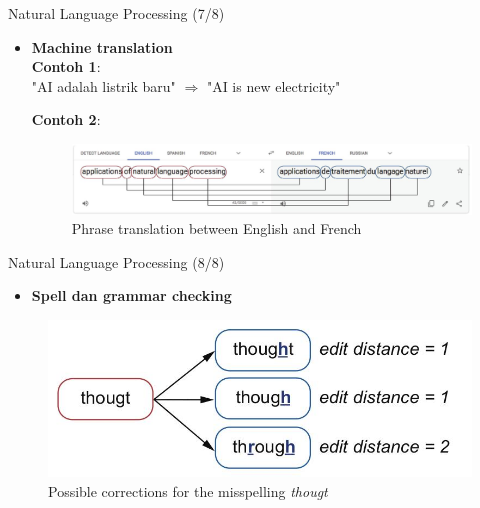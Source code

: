 \documentclass[pdf]{beamer}
\theoremstyle{mystyle}
\begin{document}
\begin{frame}{Natural Language Processing (7/8)}
	\begin{itemize}
		\item \textbf{Machine translation} 	\\
	\textbf{Contoh 1}:\\
"AI adalah listrik baru" $\Longrightarrow$ "AI is new electricity"

\bigskip
\textbf{Contoh 2}:
\begin{figure}[!ht]
	\centering
	\includegraphics[scale=.2]{images/phrase-translation}
	\caption{Phrase translation between English and French}
\end{figure}
	\end{itemize}
\end{frame}

\begin{frame}{Natural Language Processing (8/8)}
	\begin{itemize}
		\item \textbf{Spell dan grammar checking}
	\end{itemize}
	\begin{figure}[!ht]
		\centering
		\includegraphics[scale=.2]{images/edit-distance}
		\caption{Possible corrections for the misspelling \textit{thougt}}
	\end{figure}
\end{frame}
\end{document}
